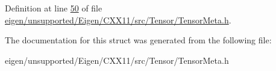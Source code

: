 Definition at line \hyperlink{eigen_2unsupported_2_eigen_2_c_x_x11_2src_2_tensor_2_tensor_meta_8h_source_l00050}{50} of file \hyperlink{eigen_2unsupported_2_eigen_2_c_x_x11_2src_2_tensor_2_tensor_meta_8h_source}{eigen/unsupported/\+Eigen/\+C\+X\+X11/src/\+Tensor/\+Tensor\+Meta.\+h}.



The documentation for this struct was generated from the following file\+:\begin{DoxyCompactItemize}
\item 
eigen/unsupported/\+Eigen/\+C\+X\+X11/src/\+Tensor/\+Tensor\+Meta.\+h\end{DoxyCompactItemize}

